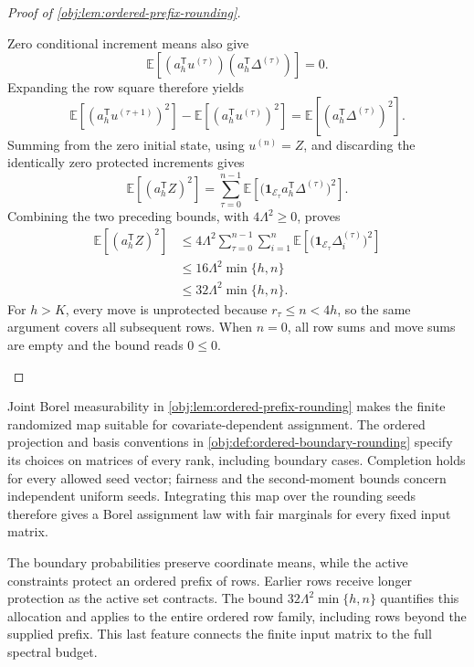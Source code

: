 \documentclass[11pt]{article}
\begin{document}
\begin{proof}[Proof of \cref{obj:lem:ordered-prefix-rounding}]
\begin{enumerate}
Zero conditional increment means also give
\[
\mathbb E\!\left[
(a_h^{\mathsf T}u^{(\tau)})
(a_h^{\mathsf T}\Delta^{(\tau)})
\right]=0.
\]
Expanding the row square therefore yields
\[
\mathbb E[(a_h^{\mathsf T}u^{(\tau+1)})^2]
-
\mathbb E[(a_h^{\mathsf T}u^{(\tau)})^2]
=
\mathbb E[(a_h^{\mathsf T}\Delta^{(\tau)})^2].
\]
Summing from the zero initial state, using \(u^{(n)}=Z\), and discarding the identically zero protected increments gives
\[
\mathbb E[(a_h^{\mathsf T}Z)^2]
=
\sum_{\tau=0}^{n-1}
\mathbb E\!\left[
\bigl(\mathbf1_{\mathcal E_\tau}a_h^{\mathsf T}\Delta^{(\tau)}\bigr)^2
\right].
\]
Combining the two preceding bounds, with \(4\Lambda^2\geq0\), proves
\[
\begin{aligned}
\mathbb E[(a_h^{\mathsf T}Z)^2]
&\leq
4\Lambda^2
\sum_{\tau=0}^{n-1}\sum_{i=1}^n
\mathbb E\!\left[
\bigl(\mathbf1_{\mathcal E_\tau}\Delta_i^{(\tau)}\bigr)^2
\right]\\
&\leq16\Lambda^2\min\{h,n\}\\
&\leq32\Lambda^2\min\{h,n\}.
\end{aligned}
\]
For \(h>K\), every move is unprotected because \(r_\tau\leq n<4h\), so the same argument covers all subsequent rows. When \(n=0\), all row sums and move sums are empty and the bound reads \(0\leq0\).
\end{enumerate}
\end{proof}

Joint Borel measurability in \cref{obj:lem:ordered-prefix-rounding} makes the finite randomized map suitable for covariate-dependent assignment. The ordered projection and basis conventions in \cref{obj:def:ordered-boundary-rounding} specify its choices on matrices of every rank, including boundary cases. Completion holds for every allowed seed vector; fairness and the second-moment bounds concern independent uniform seeds. Integrating this map over the rounding seeds therefore gives a Borel assignment law with fair marginals for every fixed input matrix.

The boundary probabilities preserve coordinate means, while the active constraints protect an ordered prefix of rows. Earlier rows receive longer protection as the active set contracts. The bound \(32\Lambda^2\min\{h,n\}\) quantifies this allocation and applies to the entire ordered row family, including rows beyond the supplied prefix. This last feature connects the finite input matrix to the full spectral budget.
\end{document}
